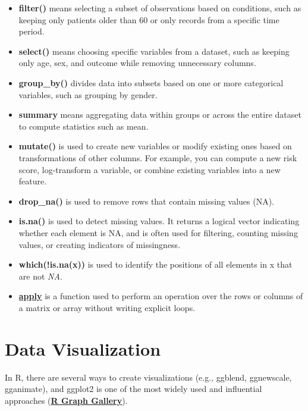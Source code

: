 \documentclass[11pt]{article}
\begin{document}
\begin{itemize}
\item \textbf{filter()} means selecting a subset of observations based on conditions, such as keeping only patients older than 60 or only records from a specific time period.
\item \textbf{select()} means choosing specific variables from a dataset, such as keeping only age, sex, and outcome while removing unnecessary columns.
\item \textbf{group\_by()} divides data into subsets based on one or more categorical variables, such as grouping by gender.
\item \textbf{summary} means aggregating data within groups or across the entire dataset to compute statistics such as mean.
\item \textbf{mutate()} is used to create new variables or modify existing ones based on transformations of other columns. For example, you can compute a new risk score, log-transform a variable, or combine existing variables into a new feature.
\item \textbf{drop\_na()} is used to remove rows that contain missing values (NA).
\item \textbf{is.na()} is used to detect missing values. It returns a logical vector indicating whether each element is NA, and is often used for filtering, counting missing values, or creating indicators of missingness.
\item \textbf{which(!is.na(x))} is used to identify the positions of all elements in x that are not \textit{NA}.
\item \href{https://stats.biopapyrus.jp/r/basic/apply.html}{\textbf{apply}} is a function used to perform an operation over the rows or columns of a matrix or array without writing explicit loops.
\end{itemize}


\section{Data Visualization}
In R, there are several ways to create visualizations (e.g., ggblend, ggnewscale, gganimate), and ggplot2 
is one of the most widely used and influential approaches (\href{https://r-graph-gallery.com/}{\textbf{R Graph Gallery}}).
\end{document}

